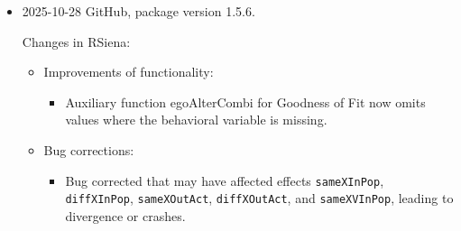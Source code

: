 \documentclass[a4paper,fleqn,11pt]{article}
\newcommand{\+}{\, + \,}
\newcommand{\sfn}[1]{\textsf{#1}}
\begin{document}
\begin{small}
\begin{itemize}
\begin{itemize}
\begin{itemize}
    \texttt{avInAltSameX}, \texttt{totInAltSameX}.
    \end{itemize}
\item Improvements of functionality:
   \begin{itemize}
    \item Distinguished between three algorithm objects.
    See Chapter~\ref{S_names}.
    \end{itemize}
\item Bug corrections:
   \begin{itemize}
  \item \texttt{checkImpossibleChanges}  restricted to networks.
  \item \texttt{checkZeroChanges}  adapted to also cover behavioral variables.
    \end{itemize}
\item Documentation:
   \begin{itemize}
  \item A new subsection was added to \texttt{Siena\_algorithms}  to explain the new
    construction of diffusion rate effects (Daniel Gotthardt).
   \item Appendix A of this manual, "List of Functions in Order of Execution",
    was dropped
    and the author of this appendix, Paulina Preciado Lopez, was
    accordingly dropped from the list of authors of the manual.
    Greetings, Paulina!
    \end{itemize}
\end{itemize}


\item 2025-10-28 GitHub, package version 1.5.6.

Changes in RSiena:
\begin{itemize}
\item Improvements of functionality:
   \begin{itemize}
  \item Auxiliary function \sfn{egoAlterCombi} for  Goodness of Fit
    now omits values  where the behavioral variable is missing.
    \end{itemize}
\item Bug corrections:
   \begin{itemize}
   \item Bug corrected that may have affected effects
   \texttt{sameXInPop}, \texttt{diffXInPop},
   \texttt{sameXOutAct}, \texttt{diffXOutAct}, and \texttt{sameXVInPop},
   leading to divergence or crashes.
    \end{itemize}
\end{itemize}



\end{itemize}
\end{small}
\end{document}
